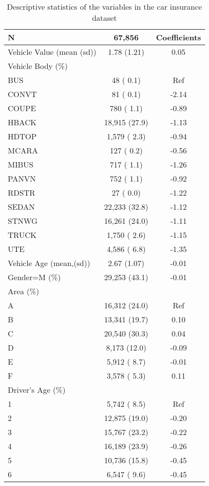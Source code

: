 \documentclass[paper=a4, fontsize=11pt]{scrartcl} %
\begin{document}
\begin{table}
\centering
\caption{Descriptive statistics of the variables in the car insurance dataset}
\label{table1}
\begin{tabular}{@{}lcc@{}}
\toprule
N & 67,856 & Coefficients \\ \midrule
Vehicle Value (mean  (sd)) & 1.78 (1.21) & 0.05 \\
Vehicle Body (\%) &  &  \\
BUS & 48 ( 0.1) & Ref \\
CONVT & 81 ( 0.1) & -2.14 \\
COUPE & 780 ( 1.1) & -0.89 \\
HBACK & 18,915 (27.9) & -1.13 \\
HDTOP & 1,579 ( 2.3) & -0.94 \\
MCARA & 127 ( 0.2) & -0.56 \\
MIBUS & 717 ( 1.1) & -1.26 \\
PANVN & 752 ( 1.1) & -0.92 \\
RDSTR & 27 ( 0.0) & -1.22 \\
SEDAN & 22,233 (32.8) & -1.12 \\
STNWG & 16,261 (24.0) & -1.11 \\
TRUCK & 1,750 ( 2.6) & -1.15 \\
UTE & 4,586 ( 6.8) & -1.35 \\
Vehicle Age (mean,(sd)) & 2.67 (1.07) & -0.01 \\
Gender=M (\%) & 29,253 (43.1) & -0.01 \\
Area (\%) &  &  \\
A & 16,312 (24.0) & Ref \\
B & 13,341 (19.7) & 0.10 \\
C & 20,540 (30.3) & 0.04 \\
D & 8,173 (12.0) & -0.09 \\
E & 5,912 ( 8.7) & -0.01 \\
F & 3,578 ( 5.3) & 0.11 \\
Driver's Age (\%) &  &  \\
1 & 5,742 ( 8.5) & Ref \\
2 & 12,875 (19.0) & -0.20 \\
3 & 15,767 (23.2) & -0.22 \\
4 & 16,189 (23.9) & -0.26 \\
5 & 10,736 (15.8) & -0.45 \\
6 & 6,547 ( 9.6) & -0.45 \\ \bottomrule
\end{tabular}
\end{table}
\end{document}

